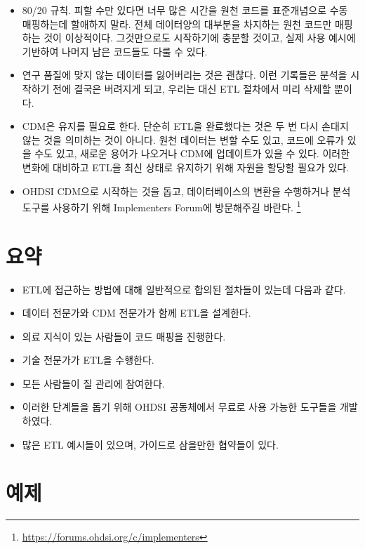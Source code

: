 \documentclass[11pt]{book}
\providecommand{\tightlist}{%
  \setlength{\itemsep}{0pt}\setlength{\parskip}{0pt}}
\let\rmarkdownfootnote\footnote%
\def\footnote{\protect\rmarkdownfootnote}
\theoremstyle{definition}
\theoremstyle{definition}
\theoremstyle{definition}
\theoremstyle{remark}
\let\BeginKnitrBlock\begin \let\EndKnitrBlock\end
\begin{document}
\begin{itemize}
\tightlist
\item
  80/20 규칙. 피할 수만 있다면 너무 많은 시간을 원천 코드를 표준개념으로
  수동 매핑하는데 할애하지 말라. 전체 데이터양의 대부분을 차지하는 원천
  코드만 매핑하는 것이 이상적이다. 그것만으로도 시작하기에 충분할
  것이고, 실제 사용 예시에 기반하여 나머지 남은 코드들도 다룰 수 있다.
\item
  연구 품질에 맞지 않는 데이터를 잃어버리는 것은 괜찮다. 이런 기록들은
  분석을 시작하기 전에 결국은 버려지게 되고, 우리는 대신 ETL 절차에서
  미리 삭제할 뿐이다.
\item
  CDM은 유지를 필요로 한다. 단순히 ETL을 완료했다는 것은 두 번 다시
  손대지 않는 것을 의미하는 것이 아니다. 원천 데이터는 변할 수도 있고,
  코드에 오류가 있을 수도 있고, 새로운 용어가 나오거나 CDM에 업데이트가
  있을 수 있다. 이러한 변화에 대비하고 ETL을 최신 상태로 유지하기 위해
  자원을 할당할 필요가 있다.
\item
  OHDSI CDM으로 시작하는 것을 돕고, 데이터베이스의 변환을 수행하거나
  분석 도구를 사용하기 위해 Implementers Forum에 방문해주길 바란다.
  \footnote{\url{https://forums.ohdsi.org/c/implementers}}
\end{itemize}

\section{요약}\label{-4}

\BeginKnitrBlock{rmdsummary}
\begin{itemize}
\item
  ETL에 접근하는 방법에 대해 일반적으로 합의된 절차들이 있는데 다음과
  같다.
\item
  데이터 전문가와 CDM 전문가가 함께 ETL을 설계한다.
\item
  의료 지식이 있는 사람들이 코드 매핑을 진행한다.
\item
  기술 전문가가 ETL을 수행한다.
\item
  모든 사람들이 질 관리에 참여한다.
\item
  이러한 단계들을 돕기 위해 OHDSI 공동체에서 무료로 사용 가능한 도구들을
  개발하였다.
\item
  많은 ETL 예시들이 있으며, 가이드로 삼을만한 협약들이 있다.
\end{itemize}
\EndKnitrBlock{rmdsummary}

\section{예제}\label{-2}
\end{document}
